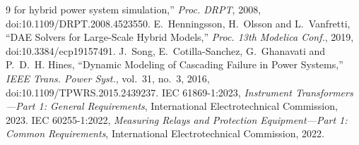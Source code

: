 {\begin{thebibliography}{9}
for hybrid power system simulation,'' \emph{Proc. DRPT}, 2008,
doi:10.1109/DRPT.2008.4523550.
 E.~Henningsson, H.~Olsson and L.~Vanfretti,
``DAE Solvers for Large-Scale Hybrid Models,'' \emph{Proc. 13th Modelica Conf.},
2019, doi:10.3384/ecp19157491.
 J.~Song, E.~Cotilla-Sanchez, G.~Ghanavati and P.~D.~H.
Hines, ``Dynamic Modeling of Cascading Failure in Power Systems,''
\emph{IEEE Trans. Power Syst.}, vol.~31, no.~3, 2016,
doi:10.1109/TPWRS.2015.2439237.
 IEC 61869-1:2023, \emph{Instrument Transformers---Part 1:
General Requirements}, International Electrotechnical Commission, 2023.
 IEC 60255-1:2022, \emph{Measuring Relays and Protection
Equipment---Part 1: Common Requirements}, International Electrotechnical
Commission, 2022.
\end{thebibliography}}
